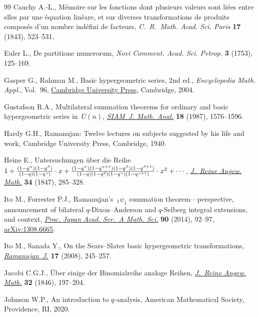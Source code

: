 \documentclass[pdftex]{sigma}
\numberwithin{equation}{section}
\begin{document}
\begin{thebibliography}{99}
Cauchy A.-L., M\'emoire sur les fonctions dont plusieurs valeurs sont li\'ees
 entre elles par une \'equation lin\'eare, et sur diverses transformations de
 produits composés d'un nombre ind\'efini de facteurs, \textit{C.~R.~Math.
 Acad. Sci. Paris} \textbf{17} (1843), 523--531.

Euler L., De partitione numerorum, \textit{Novi Comment. Acad. Sci. Petrop.}
 \textbf{3} (1753), 125--169.

Gasper G., Rahman M., Basic hypergeometric series, 2nd ed., \textit{Encyclopedia Math.
 Appl.}, Vol.~96,
 \href{https://doi.org/10.1017/CBO9780511526251}{Cambridge University Press},
 Cambridge, 2004.

Gustafson R.A., Multilateral summation theorems for ordinary and basic
 hypergeometric series in~{$U(n)$},
 \href{https://doi.org/10.1137/0518114}{\textit{SIAM~J. Math. Anal.}}
 \textbf{18} (1987), 1576--1596.

Hardy G.H., Ramanujan: {T}welve lectures on subjects suggested by his life and
 work, Cambridge University Press, Cambridge, 1940.

Heine E., Untersuchungen \"uber die {R}eihe $1+{(1-q^{\alpha})(1-q^{\beta})
 \over (1-q)(1-q^{\gamma})} \cdot x +
 {(1-q^{\alpha})(1-q^{\alpha+1})(1-q^{\beta})(1-q^{\beta+1}) \over
 (1-q)(1-q^2)(1-q^{\gamma})(1-q^{\gamma+1})} \cdot x^2 + \cdots$,
 \href{https://doi.org/10.1515/crll.1847.34.285}{\textit{J.~Reine Angew.
 Math.}} \textbf{34} (1847), 285--328.

Ito M., Forrester P.J., Ramanujan's~{${}_1\psi_1$} summation
 theorem---perspective, announcement of bilateral {$q$}-{D}ixon--{A}nderson
 and {$q$}-{S}elberg integral extensions, and context,
 \href{https://doi.org/10.3792/pjaa.90.92}{\textit{Proc. Japan Acad. Ser.~A
 Math. Sci.}} \textbf{90} (2014), 92--97,
 \href{http://arxiv.org/abs/1308.6665}{arXiv:1308.6665}.

Ito M., Sanada Y., On the {S}ears--{S}later basic hypergeometric
 transformations,
 \href{https://doi.org/10.1007/s11139-006-9012-6}{\textit{Ramanujan~J.}}
 \textbf{17} (2008), 245--257.

Jacobi C.G.J., \"Uber einige der {B}inomialreihe analoge {R}eihen,
 \href{https://doi.org/10.1515/crll.1846.32.197}{\textit{J.~Reine Angew.
 Math.}} \textbf{32} (1846), 197--204.

Johnson W.P., An introduction to {$q$}-analysis, American Mathematical Society,
 Providence, RI, 2020.


\end{thebibliography}
\end{document}
